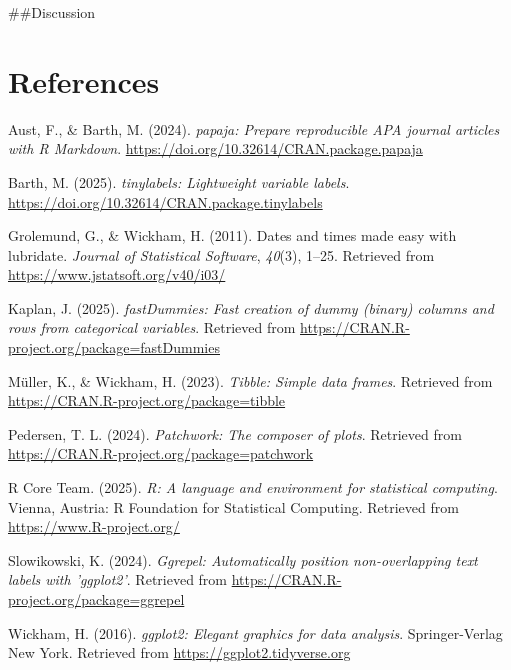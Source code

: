 \documentclass[
  man,floatsintext]{apa6}
\newlength{\cslhangindent}
\newenvironment{CSLReferences}[2] %
 {\begin{list}{}{%
  \setlength{\itemindent}{0pt}
  \setlength{\leftmargin}{0pt}
  \setlength{\parsep}{0pt}
  \ifodd #1
   \setlength{\leftmargin}{\cslhangindent}
   \setlength{\itemindent}{-1\cslhangindent}
  \fi
  \setlength{\itemsep}{#2\baselineskip}}}
 {\end{list}}
\begin{document}
\#\#Discussion

\newpage

\section{References}\label{references}

\label{refs}
\begin{CSLReferences}{1}{0}
Aust, F., \& Barth, M. (2024). \emph{{papaja}: {Prepare} reproducible {APA} journal articles with {R Markdown}}. \url{https://doi.org/10.32614/CRAN.package.papaja}

Barth, M. (2025). \emph{{tinylabels}: Lightweight variable labels}. \url{https://doi.org/10.32614/CRAN.package.tinylabels}

Grolemund, G., \& Wickham, H. (2011). Dates and times made easy with {lubridate}. \emph{Journal of Statistical Software}, \emph{40}(3), 1--25. Retrieved from \url{https://www.jstatsoft.org/v40/i03/}

Kaplan, J. (2025). \emph{fastDummies: Fast creation of dummy (binary) columns and rows from categorical variables}. Retrieved from \url{https://CRAN.R-project.org/package=fastDummies}

Müller, K., \& Wickham, H. (2023). \emph{Tibble: Simple data frames}. Retrieved from \url{https://CRAN.R-project.org/package=tibble}

Pedersen, T. L. (2024). \emph{Patchwork: The composer of plots}. Retrieved from \url{https://CRAN.R-project.org/package=patchwork}

R Core Team. (2025). \emph{R: A language and environment for statistical computing}. Vienna, Austria: R Foundation for Statistical Computing. Retrieved from \url{https://www.R-project.org/}

Slowikowski, K. (2024). \emph{Ggrepel: Automatically position non-overlapping text labels with 'ggplot2'}. Retrieved from \url{https://CRAN.R-project.org/package=ggrepel}

Wickham, H. (2016). \emph{ggplot2: Elegant graphics for data analysis}. Springer-Verlag New York. Retrieved from \url{https://ggplot2.tidyverse.org}


\end{CSLReferences}
\end{document}

